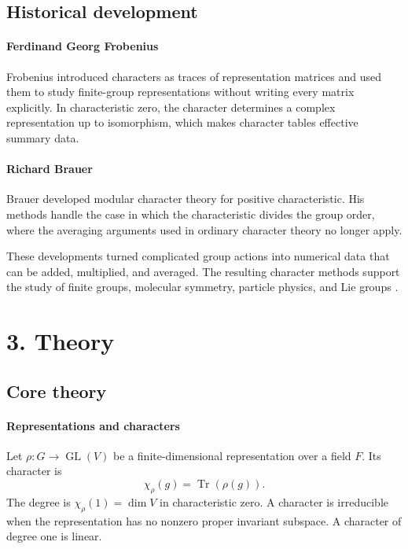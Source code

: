 \subsection*{Historical development}
\begin{historylist}
\paragraph{Ferdinand Georg Frobenius}
Frobenius introduced characters as traces of representation matrices and used them to study finite-group representations without writing every matrix explicitly. In characteristic zero, the character determines a complex representation up to isomorphism, which makes character tables effective summary data.

\paragraph{Richard Brauer}
Brauer developed modular character theory for positive characteristic. His methods handle the case in which the characteristic divides the group order, where the averaging arguments used in ordinary character theory no longer apply.

These developments turned complicated group actions into numerical data that can be added, multiplied, and averaged. The resulting character methods support the study of finite groups, molecular symmetry, particle physics, and Lie groups \cite{character_theory_ref1,character_theory_ref3}.

\end{historylist}
\section*{3. Theory}
\subsection*{Core theory}
\paragraph{Representations and characters}

Let $\rho:G\to\operatorname{GL}(V)$ be a finite-dimensional representation over a field $F$. Its character is
\[
 \chi_\rho(g)=\operatorname{Tr}(\rho(g)).
\]
The degree is $\chi_\rho(1)=\dim V$ in characteristic zero. A character is irreducible when the representation has no nonzero proper invariant subspace. A character of degree one is linear.

